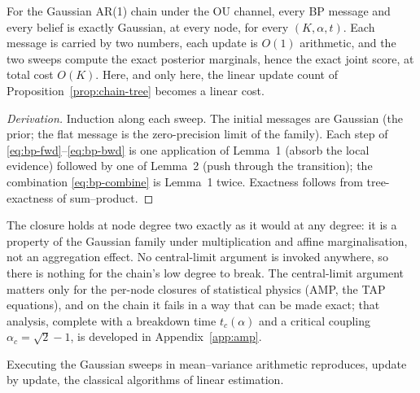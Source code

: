 \begin{theorem}\label{thm:bp-closure}
For the Gaussian AR(1) chain under the OU channel, every BP message and
every belief is exactly Gaussian, at every node, for every
$(K, \alpha, t)$. Each message is carried by two numbers, each update is
$O(1)$ arithmetic, and the two sweeps compute the exact posterior
marginals, hence the exact joint score, at total cost $O(K)$. Here, and
only here, the linear update count of Proposition~\ref{prop:chain-tree}
becomes a linear cost.
\end{theorem}

\begin{proof}[Derivation]
Induction along each sweep. The initial messages are Gaussian (the prior;
the flat message is the zero-precision limit of the family). Each step of
\eqref{eq:bp-fwd}--\eqref{eq:bp-bwd} is one application of Lemma~1 (absorb
the local evidence) followed by one of Lemma~2 (push through the
transition); the combination \eqref{eq:bp-combine} is Lemma~1 twice.
Exactness follows from tree-exactness of sum--product.
\end{proof}

\begin{remark}
\label{rmk:bp-no-clt}
The closure holds at node degree two exactly as it would at any degree:
it is a property of the Gaussian family under multiplication and affine
marginalisation, not an aggregation effect. No central-limit argument is
invoked anywhere, so there is nothing for the chain's low degree to
break. The central-limit argument matters only for the per-node closures
of statistical physics (AMP, the TAP equations), and on the chain it
fails in a way that can be made exact; that analysis, complete with a
breakdown time $t_c(\alpha)$ and a critical coupling
$\alpha_c = \sqrt{2} - 1$, is developed in Appendix~\ref{app:amp}.
\end{remark}

Executing the Gaussian sweeps in mean--variance arithmetic reproduces,
update by update, the classical algorithms of linear estimation.

